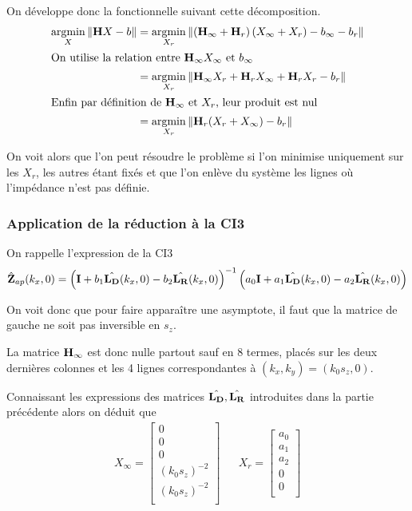 On développe donc la fonctionnelle suivant cette décomposition.
\begin{align*}
{\underset{X}{\operatorname{argmin}}}\left\rVert {\mathbf{H}} X - {b} \right \rVert &= {\underset{X_r}{\operatorname{argmin}}}\left\rVert \left({\mathbf{H}}_\infty + {\mathbf{H}}_r\right)\left( X_\infty + X_r \right) - {b}_\infty - {b}_r \right \rVert
\\
\intertext{On utilise la relation entre \({\mathbf{H}}_\infty X_\infty\) et \({b}_\infty\)}
&=  {\underset{X_r}{\operatorname{argmin}}}\left\rVert {\mathbf{H}}_\infty X_r + {\mathbf{H}}_r X_\infty + {\mathbf{H}}_r X_r - {b}_r \right \rVert
\\
\intertext{Enfin par définition de \({\mathbf{H}}_\infty\) et \(X_r\), leur produit est nul}
&= {\underset{X_r}{\operatorname{argmin}}} \left\rVert {\mathbf{H}}_r ( X_r + X_\infty)- {b}_r \right \rVert
\end{align*}

On voit alors que l'on peut résoudre le problème si l'on minimise uniquement sur les \(X_r\), les autres étant fixés et que l'on enlève du système les lignes où l'impédance n'est pas définie.

\subsubsection{Application de la réduction à la CI3}

On rappelle l'expression de la CI3
\begin{equation*}
  \hat{\mathbf{Z}}_{ap}(k_x,0) = \left(\mathbf{I} + b_1 \hat{\mathbf{L_D}}(k_x,0) - b_2 \hat{\mathbf{L_R}}(k_x,0) \right)^{-1}\left(a_0\mathbf{I} + a_1 \hat{\mathbf{L_D}}(k_x,0) - a_2 \hat{\mathbf{L_R}}(k_x,0) \right)
\end{equation*}

On voit donc que pour faire apparaître une asymptote, il faut que la matrice de gauche ne soit pas inversible en \(s_z\).

La matrice \({\mathbf{H}}_\infty\) est donc nulle partout sauf en 8 termes, placés sur les deux dernières colonnes et les 4 lignes correspondantes à \((k_x,k_y)=(k_0 s_z,0)\).

Connaissant les expressions des matrices \(\hat{\mathbf{L_D}},\hat{\mathbf{L_R}}\) introduites dans la partie précédente alors on déduit que
\begin{align*}
  X_\infty = \begin{bmatrix}
    0\\
    0\\
    0\\
    (k_0 s_z)^{-2}\\
    (k_0 s_z)^{-2}\\
  \end{bmatrix}
  & &
  X_r = \begin{bmatrix}
  a_0\\
  a_1\\
  a_2\\
  0\\
  0\\
  \end{bmatrix}
\end{align*}

